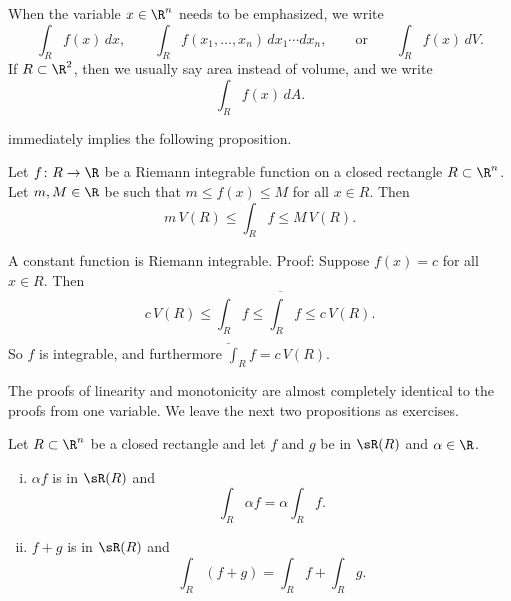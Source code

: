 When the variable $x \in \R^n$ needs to be emphasized, we write
\begin{equation*}
\int_R f(x)\,dx,
\qquad
\int_R f(x_1,\ldots,x_n)\,dx_1 \cdots dx_n,
\qquad
\text{or}
\qquad
\int_R f(x)\,dV .
\end{equation*}
If $R \subset \R^2$, then we usually say area instead of volume, and we
write
\begin{equation*}
\int_R f(x)\,dA .
\end{equation*}

 immediately implies the following
proposition.

\begin{prop} \label{mv:intbound:prop}
Let $f \colon R \to \R$ be a Riemann integrable function
on a closed rectangle $R \subset \R^n$.
Let $m, M \in \R$ be 
such that $m \leq f(x) \leq M$ for all $x \in R$.  Then
\begin{equation*}
m \, V(R) \leq
\int_{R} f
\leq M \, V(R) .
\end{equation*}
\end{prop}

\begin{example}
A constant function is Riemann integrable.  Proof: Suppose
$f(x) = c$ for all $x \in R$.  Then
\begin{equation*}
c \, V(R) \leq \underline{\int_R} f \leq \overline{\int_R} f \leq c\, V(R) .
\end{equation*}
So $f$ is integrable, and furthermore $\int_R f = c\,V(R)$.
\end{example}

The proofs of linearity and monotonicity are almost completely identical to
the proofs from one variable.
We leave the next two propositions as exercises.

\begin{samepage}
\begin{prop}[Linearity] \label{mv:intlinearity:prop}
Let $R \subset \R^n$ be a closed rectangle and let
$f$ and $g$ be in $\sR(R)$ and $\alpha \in \R$.
\begin{enumerate}[(i)]
\item $\alpha f$ is in $\sR(R)$ and
\begin{equation*}
\int_R \alpha f = \alpha \int_R f .
\end{equation*}
\item $f+g$ is in $\sR(R)$ and
\begin{equation*}
\int_R (f+g) = 
\int_R f
+
\int_R g .
\end{equation*}
\end{enumerate}
\end{prop}
\end{samepage}

